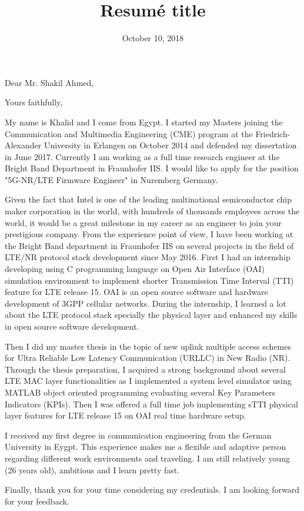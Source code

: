 \documentclass[11pt,a4paper,sans]{moderncv}        %
\title{Resumé title}                               %
\begin{document}
\date{October 10, 2018}
\opening{Dear Mr. Shakil Ahmed,}
\closing{Yours faithfully,}
\makelettertitle

My name is Khalid and I come from Egypt. I started my Masters joining the Communication and Multimedia Engineering (CME) program at the Friedrich-Alexander University in Erlangen on October 2014 and defended my dissertation in June 2017. Currently I am working as a full time research engineer at the Bright Band Department in Fraunhofer IIS. I would like to apply for the position "5G-NR/LTE Firmware Engineer" in Nuremberg Germany. 

Given the fact that Intel is one of the leading multinational semiconductor chip maker corporation in the world, with hundreds of thousands employees across the world, it would be a great milestone in my career as an engineer to join your prestigious company. From the experience point of view, I have been working at the Bright Band department in Fraunhofer IIS on several projects in the field of LTE/NR protocol stack development since May 2016. First I had an internship developing using C programming language on Open Air Interface (OAI) simulation environment to implement shorter Transmission Time Interval (TTI) feature for LTE release 15. OAI is an open source software and hardware development of 3GPP cellular networks. During the internship, I learned a lot about the LTE protocol stack specially the physical layer and enhanced my skills in open source software development. 

Then I did my master thesis in the topic of new uplink multiple access schemes for Ultra Reliable Low Latency Communication (URLLC) in New Radio (NR). Through the thesis preparation, I acquired a strong background about several LTE MAC layer functionalities as I implemented a system level simulator using MATLAB object oriented programming evaluating several Key Parameters Indicators (KPIs). Then I was offered a full time job implementing sTTI physical layer features for LTE release 15 on OAI real time hardware setup. 

I received my first degree in communication engineering from the German University in Eygpt. This experience makes me a flexible and adaptive person regarding different work environments and traveling. I am still relatively young (26 years old), ambitious and I learn pretty fast. 

Finally, thank you for your time considering my credentials. 
I am looking forward for your feedback.

\makeletterclosing
\end{document}
